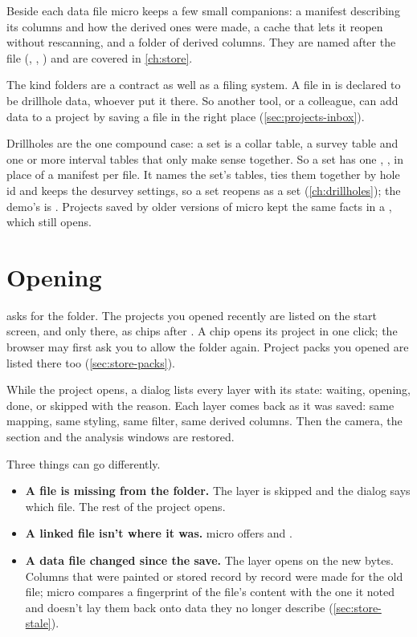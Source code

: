 Beside each data file micro keeps a few small companions: a manifest describing its columns and how the derived ones were made, a cache that lets it reopen without rescanning, and a folder of derived columns. They are named after the file (, , ) and are covered in \cref{ch:store}.

\begin{why}
The kind folders are a contract as well as a filing system. A file in  is declared to be drillhole data, whoever put it there. So another tool, or a colleague, can add data to a project by saving a file in the right place (\cref{sec:projects-inbox}).
\end{why}

Drillholes are the one compound case: a set is a collar table, a survey table and one or more interval tables that only make sense together. So a set has one , , in place of a manifest per file. It names the set's tables, ties them together by hole id and keeps the desurvey settings, so a set reopens as a set (\cref{ch:drillholes}); the demo's is . Projects saved by older versions of micro kept the same facts in a , which still opens.

\section{Opening}\label{sec:projects-open}
 asks for the folder. The projects you opened recently are listed on the start screen, and only there, as chips after . A chip opens its project in one click; the browser may first ask you to allow the folder again. Project packs you opened are listed there too (\cref{sec:store-packs}).

While the project opens, a dialog lists every layer with its state: waiting, opening, done, or skipped with the reason. Each layer comes back as it was saved: same mapping, same styling, same filter, same derived columns. Then the camera, the section and the analysis windows are restored.

Three things can go differently.

\begin{itemize}
\item \textbf{A file is missing from the folder.} The layer is skipped and the dialog says which file. The rest of the project opens.
\item \textbf{A linked file isn't where it was.} micro offers  and .
\item \textbf{A data file changed since the save.} The layer opens on the new bytes. Columns that were painted or stored record by record were made for the old file; micro compares a fingerprint of the file's content with the one it noted and doesn't lay them back onto data they no longer describe (\cref{sec:store-stale}).
\end{itemize}

